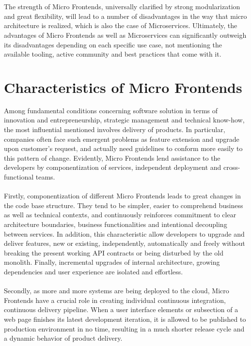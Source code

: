 \documentclass[a4paper]{book}
\begin{document}
\\ \\
The strength of Micro Frontends, universally clarified by strong modularization and great flexibility, will lead to a number of disadvantages in the way that micro architecture is realized, which is also the case of Microservices. Ultimately, the advantages of Micro Frontends as well as Microservices can significantly outweigh its disadvantages depending on each specific use case, not mentioning the available tooling, active community and best practices that come with it. 

\section{Characteristics of Micro Frontends}
Among fundamental conditions concerning software solution in terms of innovation and entrepreneurship, strategic management and technical know-how, the most influential mentioned involves delivery of products. In particular, companies often face such emergent problems as feature extension and upgrade upon customer's request, and actually need guidelines to conform more easily to this pattern of change. Evidently, Micro Frontends lend assistance to the developers by componentization of services, independent deployment and cross-functional teams.
\\ \\
Firstly, componentization of different Micro Frontends leads to great changes in the code base structure. They tend to be simpler, easier to comprehend business as well as technical contexts, and continuously reinforces commitment to clear architecture boundaries, business functionalities and intentional decoupling between services. In addition, this characteristic allow developers to upgrade and deliver features, new or existing, independently, automatically and freely without breaking the present working API contracts or being disturbed by the old monolith. Finally, incremental upgrades of internal architecture, growing dependencies and user experience are isolated and effortless.
\\ \\
Secondly, as more and more systems are being deployed to the cloud, Micro Frontends have a crucial role in creating individual continuous integration, continuous delivery pipeline. When a user interface elements or subsection of a web page finishes its latest development iteration, it is allowed to be published to production environment in no time, resulting in a much shorter release cycle and a dynamic behavior of product delivery. 
\end{document}
